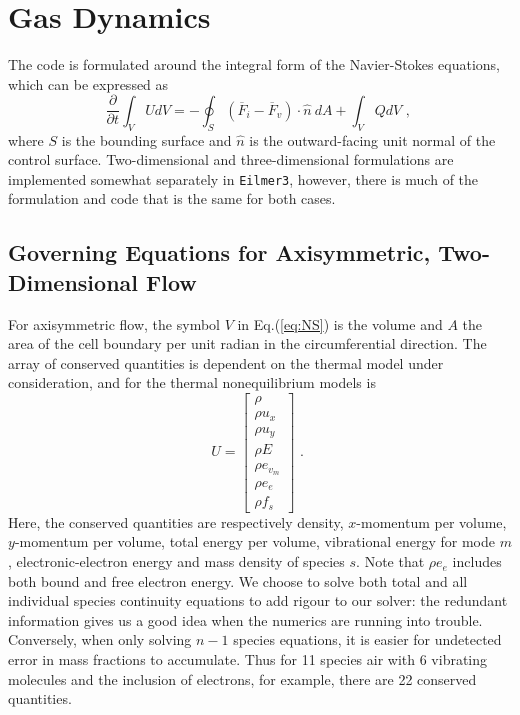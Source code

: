 
\section{Gas Dynamics}
\label{sec:gas-dynamics}  %
%
The code is formulated around the integral form of the Navier-Stokes equations, which can be expressed as
\begin{equation}
 \frac{\partial}{\partial t} \int_{V} U dV = - \oint_{S} \left ( \overline{F}_{i} - \overline{F}_{v} \right ) \cdot \hat{n}~dA + \int_{V} Q dV \text{ , }
 \label{eq:NS}
\end{equation}
where $S$ is the bounding surface and $\hat{n}$ is the outward-facing unit normal of the control surface.
Two-dimensional and three-dimensional formulations are implemented somewhat separately in \texttt{Eilmer3},
however, there is much of the formulation and code that is the same for both cases. 

\subsection{Governing Equations for Axisymmetric, Two-Dimensional Flow}
%
For axisymmetric flow, the symbol $V$ in Eq.(\ref{eq:NS}) is the volume 
and $A$ the area of the cell boundary per unit radian in the circumferential direction.
The array of conserved quantities is dependent on the thermal model under consideration, 
and for the thermal nonequilibrium models is
\begin{equation}
 U = \left [ \begin{array}{c} 
                 \rho \\
                 \rho u_{x} \\
                 \rho u_{y} \\
                 \rho E \\
                 \rho e_{v_{m}} \\
                 \rho e_{e} \\
                 \rho f_{s}
              \end{array} \right ] \text{ . }
 \label{eq:U_vector}
\end{equation}
Here, the conserved quantities are respectively density, $x$-momentum per volume, $y$-momentum per volume, 
total energy per volume, vibrational energy for mode $m$, electronic-electron energy and mass density of species $s$.
Note that $\rho e_{e}$ includes both bound and free electron energy.
We choose to solve both total and all individual species continuity equations to add rigour to our solver: the redundant information gives us a good idea when the
numerics are running into trouble.  Conversely, when only solving $n-1$ species equations, it is easier for undetected error in mass fractions to accumulate.
Thus for 11 species air with 6 vibrating molecules and the inclusion of electrons, 
for example, there are 22 conserved quantities.  

